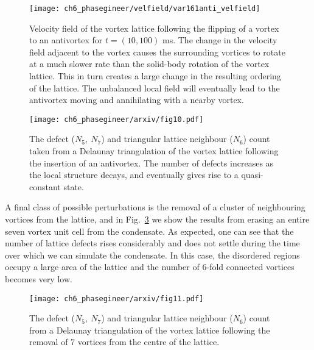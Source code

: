 \begin{figure}\centering
    \texttt{[image: ch6\_phasegineer/velfield/var161anti\_velfield]}
    \caption{Velocity field of the vortex lattice following the flipping of a vortex to an antivortex for $t=(10,100)$ ms. The change in the velocity field adjacent to the vortex causes the surrounding vortices to rotate at a much slower rate than the solid-body rotation of the vortex lattice. This in turn creates a large change in the resulting ordering of the lattice. The unbalanced local field will eventually lead to the antivortex moving and annihilating with a nearby vortex.}
    \label{fig:varr161anti_velfield}
\end{figure}


\begin{figure}\centering
    \texttt{[image: ch6\_phasegineer/arxiv/fig10.pdf]}
    \caption{The defect ($N_5,~N_7$) and triangular lattice neighbour ($N_6$) count taken from a Delaunay triangulation of the vortex lattice following the insertion of an antivortex. The number of defects increases as the local structure decays, and eventually gives rise to a quasi-constant state.}\label{fig:varr161anti_defect}
\end{figure}

A final class of possible perturbations is the removal of a cluster of neighbouring vortices from the lattice, and in Fig.~\ref{fig:remove7_defect} we show the results from erasing an entire seven vortex unit cell from the condensate. As expected, one can see that the number of lattice defects rises considerably and does not settle during the time over which we can simulate the condensate. In this case, the disordered regions occupy a large area of the lattice and the number of 6-fold connected vortices becomes very low.

\begin{figure}\centering
    \texttt{[image: ch6\_phasegineer/arxiv/fig11.pdf]}
    \caption{The defect ($N_5,~N_7$) and triangular lattice neighbour ($N_6$) count from a Delaunay triangulation of the vortex lattice following the removal of 7 vortices from the centre of the lattice. }\label{fig:remove7_defect}
\end{figure}

